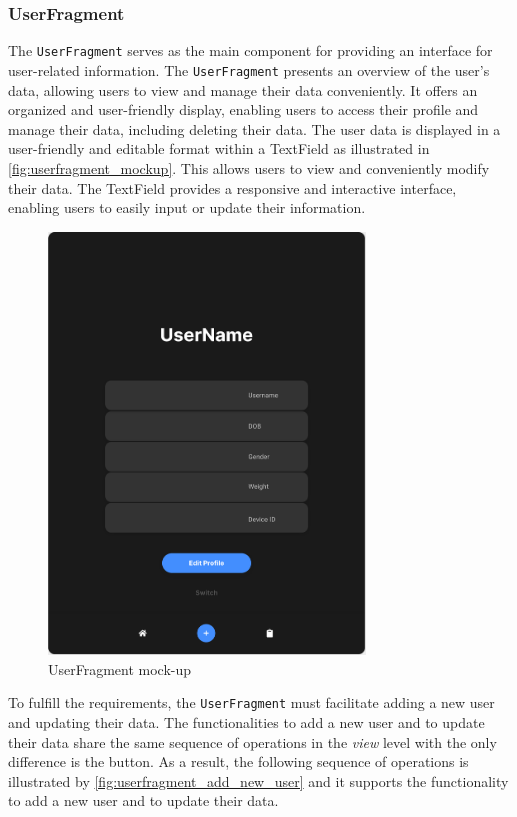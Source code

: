 \subsubsection{UserFragment}
The \texttt{UserFragment} serves as the main component for providing an interface for user-related information. 
The \texttt{UserFragment} presents an overview of the user's data, allowing users to view and manage their data conveniently. 
It offers an organized and user-friendly display, enabling users to access their profile and manage their data, including deleting their data.
The user data is displayed in a user-friendly and editable format within a TextField as illustrated in \autoref{fig:userfragment_mockup}. This allows users to view and conveniently modify their data. 
The TextField provides a responsive and interactive interface, enabling users to easily input or update their information. 

\begin{figure}[H]
    \centering
    \includegraphics[width=0.75\textwidth]{images/user-fragment-mockup.png}
    \caption{UserFragment mock-up}
    \label{fig:userfragment_mockup}
\end{figure}

To fulfill the requirements, the \texttt{UserFragment} must facilitate adding a new user and updating their data. The functionalities to add a new user and to update their data share the same sequence of operations in the \emph{view} level with the only difference is the button.
As a result, the following sequence of operations is illustrated by \autoref{fig:userfragment_add_new_user} and it supports the functionality to add a new user and to update their data.

